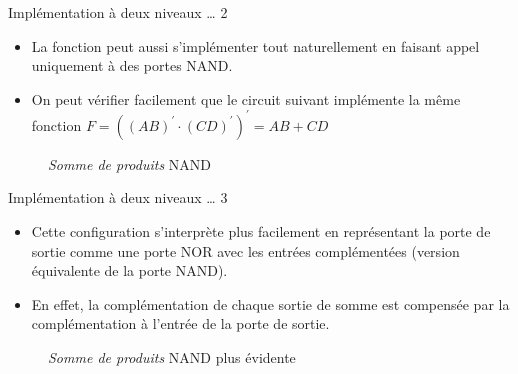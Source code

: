 \documentclass[presentation]{beamer}
\begin{document}
\begin{frame}[label={sec:org1b35840}]{Implémentation à deux niveaux \ldots{} 2}
\begin{itemize}
\item La fonction peut aussi s'implémenter tout naturellement en faisant appel uniquement à des portes NAND.

\item On peut vérifier facilement que le circuit suivant implémente la même fonction \(F = ((AB)^\prime \cdot (CD)^\prime)^\prime = AB + CD\)
\end{itemize}

\begin{figure}[htbp]
\centering

\caption{\label{fig:org6d98ccc}\emph{Somme de produits} NAND}
\end{figure} 
\end{frame}

\begin{frame}[label={sec:orga04328f}]{Implémentation à deux niveaux \ldots{} 3}
\begin{itemize}
\item Cette configuration s'interprète plus facilement en représentant la porte de sortie comme une porte NOR avec les entrées complémentées (version équivalente de la porte NAND).

\item En effet, la complémentation de chaque sortie de somme est compensée par la complémentation à l'entrée de la porte de sortie.
\end{itemize}

\begin{figure}[htbp]
\centering

\caption{\label{fig:org039cde8}\emph{Somme de produits} NAND plus évidente}
\end{figure}
\end{frame}
\end{document}
